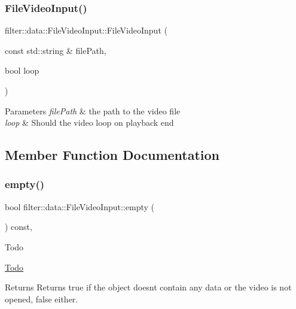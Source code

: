 \subsubsection{\texorpdfstring{File\+Video\+Input()}{FileVideoInput()}}
{\footnotesize\ttfamily filter\+::data\+::\+File\+Video\+Input\+::\+File\+Video\+Input (\begin{DoxyParamCaption}\item[{const std\+::string \&}]{file\+Path,  }\item[{bool}]{loop }\end{DoxyParamCaption})\hspace{0.3cm}{\ttfamily [inline]}}


\begin{DoxyParams}{Parameters}
{\em file\+Path} & the path to the video file \\
\hline
{\em loop} & Should the video loop on playback end \\
\hline
\end{DoxyParams}


\subsection{Member Function Documentation}
\mbox{\label{classfilter_1_1data_1_1_file_video_input_a7db00de01c31e63d49a518e737ab8799}} 
\subsubsection{\texorpdfstring{empty()}{empty()}}
{\footnotesize\ttfamily bool filter\+::data\+::\+File\+Video\+Input\+::empty (\begin{DoxyParamCaption}{ }\end{DoxyParamCaption}) const\hspace{0.3cm}{\ttfamily [inline]}, {\ttfamily [virtual]}}

\begin{DoxyRefDesc}{Todo}
\item[\hyperlink{todo__todo000021}{Todo}]\end{DoxyRefDesc}
\begin{DoxyReturn}{Returns}
Returns true if the object doesn\textquotesingle{}t contain any data or the video is not opened, false either. 
\end{DoxyReturn}


